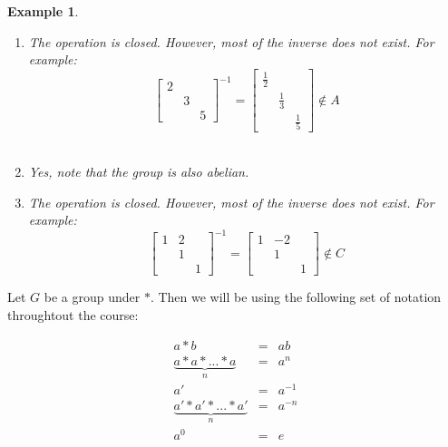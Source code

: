 \documentclass{article}
\theoremstyle{MyNonumberplain}
\theoremstyle{break}
\theoremstyle{break}
\newtheorem{example}{Example}[section]
\theoremstyle{break}
\theoremstyle{definition}
\theoremstyle{break}
\begin{document}
\begin{expbox}
\begin{example}
        \begin{ansbox}
            \begin{enumerate}
                \item The operation is closed. However, most of the inverse does not exist. For
                example:
                \[ \left[\begin{array}{ccc}
                    2 &  & \\
                    & 3 & \\
                    &  & 5
                \end{array}\right]^{- 1} = \left[\begin{array}{ccc}
                    \frac{1}{2} &  & \\
                    & \frac{1}{3} & \\
                    &  & \frac{1}{5}
                \end{array}\right] \not\in A \]\\
        
                \item Yes, note that the group is also abelian.\\
                \item The operation is closed. However, most of the inverse does not exist. For
                example:
                \[ \left[\begin{array}{ccc}
                    1 & 2 & \\
                    & 1 & \\
                    &  & 1
                \end{array}\right]^{- 1} = \left[\begin{array}{ccc}
                    1 & - 2 & \\
                    & 1 & \\
                    &  & 1
                \end{array}\right] \not\in C \]
            \end{enumerate}
    
        \end{ansbox}
    \end{example}
\end{expbox}

\newpage 

Let $G$ be a group under $*$. Then we will be using the following set of notation throughtout the course:

\begin{eqnarray}
    a*b & = & ab \nonumber\\
    \underbrace{a*a*...*a}_{n} & = & a^n \nonumber\\
    a' & = & a^{-1} \nonumber\\
    \underbrace{a'*a'*...*a'}_{n} & = & a^{-n} \nonumber\\
    a^0 & = & e \nonumber
\end{eqnarray}
\end{document}
